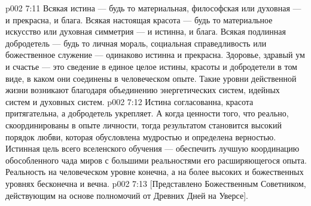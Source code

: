 \vs p002 7:11 \pc Всякая истина --- будь то материальная, философская или духовная --- и прекрасна, и блага. Всякая настоящая красота --- будь то материальное искусство или духовная симметрия --- и истинна, и блага. Всякая подлинная добродетель --- будь то личная мораль, социальная справедливость или божественное служение --- одинаково истинна и прекрасна. Здоровье, здравый ум и счастье --- это сведение в единое целое истины, красоты и добродетели в том виде, в каком они соединены в человеческом опыте. Такие уровни действенной жизни возникают благодаря объединению энергетических систем, идейных систем и духовных систем.
\vs p002 7:12 Истина согласованна, красота притягательна, а добродетель укрепляет. А когда ценности того, что реально, скоординированы в опыте личности, тогда результатом становится высокий порядок любви, которая обусловлена мудростью и определена верностью. Истинная цель всего вселенского обучения --- обеспечить лучшую координацию обособленного чада миров с большими реальностями его расширяющегося опыта. Реальность на человеческом уровне конечна, а на более высоких и божественных уровнях бесконечна и вечна.
\vsetoff
\vs p002 7:13 [Представлено Божественным Советником, действующим на основе полномочий от Древних Дней на Уверсе].
